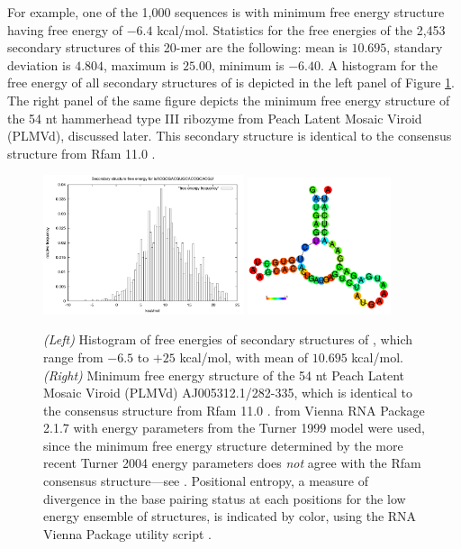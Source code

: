 For example, one of the 1,000 sequences is  with
minimum free energy structure  having free
energy of $-6.4$ kcal/mol. Statistics for the free energies of the
2,453 secondary structures of this 20-mer are the following: mean is
$10.695$, standary deviation is $4.804$, maximum is $25.00$, minimum
is $-6.40$. A histogram for the free energy of all secondary
structures of  is depicted in
the left panel of Figure \ref{fig:hermes:plmv}. The right panel of the
same figure depicts the minimum free energy structure of the
54 nt hammerhead type III ribozyme from Peach Latent Mosaic Viroid
(PLMVd), discussed later. This secondary structure is identical
to the consensus structure from Rfam 11.0 \cite{Gardner.nar11}.

\begin{figure}[!ht]
\centering
\includegraphics[width=0.525\textwidth]{Figures/Hermes/plmvDist.pdf}
\quad
\includegraphics[width=0.375\textwidth]{Figures/Hermes/plmvStr.pdf}
\caption{
{\em (Left)} Histogram of free energies of secondary structures of
, which range from $-6.5$ to $+25$ kcal/mol, with
mean of $10.695$ kcal/mol.
{\em (Right)} Minimum free energy structure of the 54 nt Peach Latent Mosaic
Viroid (PLMVd) AJ005312.1/282-335, which is identical to the consensus
structure from Rfam 11.0 \cite{Gardner.nar11}. \rfold from
Vienna RNA Package 2.1.7 with energy parameters from the Turner 1999
model were used, since the minimum free energy structure determined by
the more recent Turner 2004 energy parameters
does {\em not} agree with the Rfam consensus structure---see
\cite{synthetichammerheads}. Positional entropy, a measure
of divergence in the base pairing status at each positions for the
low energy ensemble of structures, is indicated by color, using the
RNA Vienna Package utility script .
}
\label{fig:hermes:plmv}
\end{figure}

